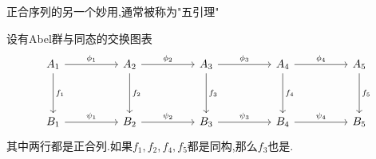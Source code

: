 \documentclass{article}
\begin{document}
正合序列的另一个妙用,通常被称为"五引理"
\begin{lemma}
    设有Abel群与同态的交换图表
    \[\begin{tikzcd}
        {A_1} && {A_2} && {A_3} && {A_4} && {A_5} \\
        \\
        {B_1} && {B_2} && {B_3} && {B_4} && {B_5}
        \arrow["{f_1}", from=1-1, to=3-1]
        \arrow["{\psi_1}", from=3-1, to=3-3]
        \arrow["{\psi_2}", from=3-3, to=3-5]
        \arrow["{\psi_3}", from=3-5, to=3-7]
        \arrow["{\psi_4}", from=3-7, to=3-9]
        \arrow["{\phi_1}", from=1-1, to=1-3]
        \arrow["{f_2}", from=1-3, to=3-3]
        \arrow["{\phi_2}", from=1-3, to=1-5]
        \arrow["{f_3}", from=1-5, to=3-5]
        \arrow["{\phi_3}", from=1-5, to=1-7]
        \arrow["{f_4}", from=1-7, to=3-7]
        \arrow["{\phi_4}", from=1-7, to=1-9]
        \arrow["{f_5}", from=1-9, to=3-9]
    \end{tikzcd}\]
    其中两行都是正合列.如果$f_1,f_2,f_4,f_5$都是同构,那么$f_3$也是.
\end{lemma}
\end{document}
